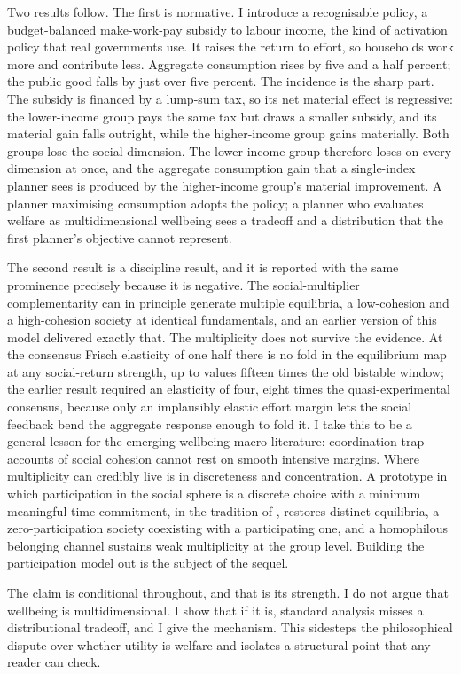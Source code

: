 \documentclass[11pt]{article}
\begin{document}
Two results follow. The first is normative. I introduce a recognisable policy, a budget-balanced make-work-pay subsidy to labour income, the kind of activation policy that real governments use. It raises the return to effort, so households work more and contribute less. Aggregate consumption rises by five and a half percent; the public good falls by just over five percent. The incidence is the sharp part. The subsidy is financed by a lump-sum tax, so its net material effect is regressive: the lower-income group pays the same tax but draws a smaller subsidy, and its material gain falls outright, while the higher-income group gains materially. Both groups lose the social dimension. The lower-income group therefore loses on every dimension at once, and the aggregate consumption gain that a single-index planner sees is produced by the higher-income group's material improvement. A planner maximising consumption adopts the policy; a planner who evaluates welfare as multidimensional wellbeing sees a tradeoff and a distribution that the first planner's objective cannot represent.

The second result is a discipline result, and it is reported with the same prominence precisely because it is negative. The social-multiplier complementarity can in principle generate multiple equilibria, a low-cohesion and a high-cohesion society at identical fundamentals, and an earlier version of this model delivered exactly that. The multiplicity does not survive the evidence. At the consensus Frisch elasticity of one half there is no fold in the equilibrium map at any social-return strength, up to values fifteen times the old bistable window; the earlier result required an elasticity of four, eight times the quasi-experimental consensus, because only an implausibly elastic effort margin lets the social feedback bend the aggregate response enough to fold it. I take this to be a general lesson for the emerging wellbeing-macro literature: coordination-trap accounts of social cohesion cannot rest on smooth intensive margins. Where multiplicity can credibly live is in discreteness and concentration. A prototype in which participation in the social sphere is a discrete choice with a minimum meaningful time commitment, in the tradition of \citet{brock2001}, restores distinct equilibria, a zero-participation society coexisting with a participating one, and a homophilous belonging channel sustains weak multiplicity at the group level. Building the participation model out is the subject of the sequel.

The claim is conditional throughout, and that is its strength. I do not argue that wellbeing is multidimensional. I show that if it is, standard analysis misses a distributional tradeoff, and I give the mechanism. This sidesteps the philosophical dispute over whether utility is welfare and isolates a structural point that any reader can check.
\end{document}

